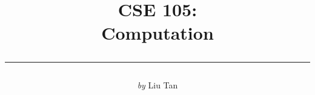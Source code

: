 \documentclass[12pt, letterpaper, titlepage]{article}
\title{\Huge CSE 105: \\ Computation
	   \\[-1em] \rule{.8\textwidth}{1pt}
}
\author{\LARGE{\it by} Liu Tan}
\date{}
\theoremstyle{mystyle}
\renewcommand{\(}{ \left(  }
\renewcommand{\)}{ \right) }
\begin{document}
\maketitle
\renewcommand{\thepage}{\roman{page}}\setcounter{page}{1}
\tableofcontents\clearpage
\renewcommand{\thepage}{\arabic{page}}\setcounter{page}{1}





\end{document}

